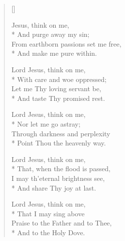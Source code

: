 \newHymn


\begin{verse}[\versewidth]

 Jesus, think on me,\\*
And purge away my sin;\\
From earthborn passions set me free,\\*
And make me pure within.

Lord Jesus, think on me,\\*
With care and woe oppressed;\\
Let me Thy loving servant be,\\*
And taste Thy promised rest.

Lord Jesus, think on me,\\*
Nor let me go astray;\\
Through darkness and perplexity\\*
Point Thou the heavenly way.

Lord Jesus, think on me,\\*
That, when the flood is passed,\\
I may th'eternal brightness see,\\*
And share Thy joy at last.

Lord Jesus, think on me,\\*
That I may sing above\\
Praise to the Father and to Thee,\\*
And to the Holy Dove.


\end{verse}

